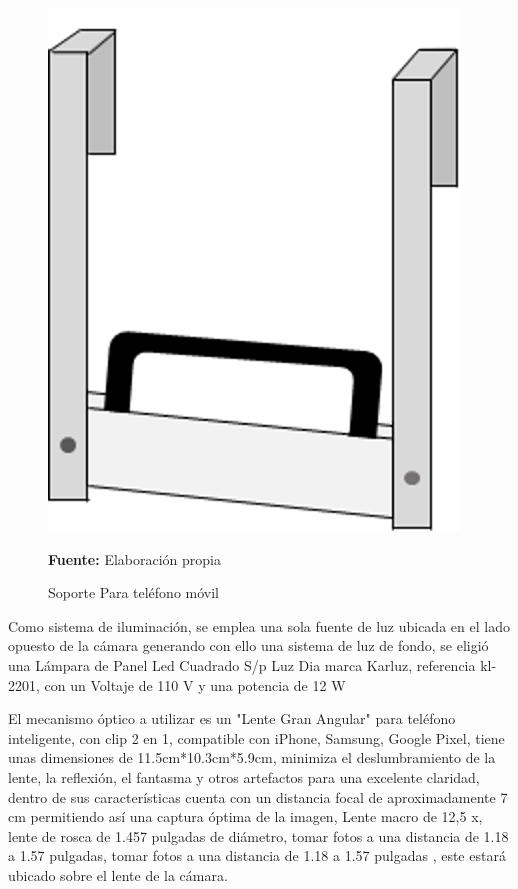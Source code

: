 \documentclass[12pt,twocolumn,a4paper]{article}
\begin{document}
\begin{figure}
	\centering
	\includegraphics[scale=0.5]{soporte.png}
	\caption{Soporte Para teléfono móvil} \textbf{Fuente:} Elaboración propia
	\label{lente}
\end{figure}

Como sistema de iluminación, se emplea una sola fuente de  luz  ubicada en el lado opuesto de la  cámara generando con ello una sistema de luz de fondo, se eligió una Lámpara  de Panel Led  Cuadrado S/p Luz Dia marca Karluz,  referencia kl-2201, con un Voltaje de 110 V  y una potencia de 12 W \cite{lampara} 

El mecanismo óptico a utilizar es un "Lente Gran Angular" para teléfono inteligente, con clip 2 en 1,  compatible con iPhone, Samsung, Google Pixel, tiene unas dimensiones de 11.5cm*10.3cm*5.9cm, minimiza el deslumbramiento de la lente, la reflexión, el fantasma y otros artefactos para una excelente claridad,  dentro de sus características cuenta con un distancia focal de aproximadamente 7 cm permitiendo así una captura óptima de la imagen, Lente macro de 12,5 x,  lente de rosca de 1.457 pulgadas de diámetro, tomar fotos a una distancia de 1.18 a 1.57 pulgadas, tomar fotos a una distancia de 1.18 a 1.57 pulgadas \cite{lente}, este estará ubicado sobre el lente de la cámara.
\end{document}
